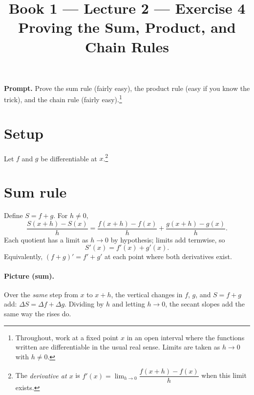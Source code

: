 \documentclass[11pt]{article}
\title{\textbf{Book 1 --- Lecture 2 --- Exercise 4}\\[2mm]
\large Proving the Sum, Product, and Chain Rules}
\author{}
\date{}
\newcommand{\promptbox}[1]{%
  \begin{savenotes}%
  \begingroup\setlength{\fboxsep}{10pt}\noindent
  \colorbox{blue!8}{\parbox{\dimexpr\linewidth-2\fboxsep\relax}{\textbf{Prompt. }#1}}
  \endgroup
  \end{savenotes}%
}
\begin{document}
\maketitle

\promptbox{Prove the sum rule (fairly easy), the product rule (easy if you know
the trick), and the chain rule (fairly easy).\footnote{Throughout, work at a fixed
point \(x\) in an open interval where the functions written are differentiable in
the usual real sense. Limits are taken as \(h\to 0\) with \(h\neq 0\).}}

\section*{Setup}
Let \(f\) and \(g\) be differentiable at \(x\).\footnote{The \emph{derivative at
\(x\)} is \(f'(x)=\lim_{h\to 0}\dfrac{f(x+h)-f(x)}{h}\) when this limit exists.}

\section*{Sum rule}
Define \(S=f+g\). For \(h\neq 0\),
\[
\frac{S(x+h)-S(x)}{h}
=\frac{f(x+h)-f(x)}{h}+\frac{g(x+h)-g(x)}{h}.
\]
Each quotient has a limit as \(h\to 0\) by hypothesis; limits add termwise, so
\[
S'(x)=f'(x)+g'(x).
\]
Equivalently, \((f+g)'=f'+g'\) at each point where both derivatives exist.

\paragraph{Picture (sum).}
Over the \emph{same} step from \(x\) to \(x+h\), the vertical changes in \(f\),
\(g\), and \(S=f+g\) add: \(\Delta S=\Delta f+\Delta g\). Dividing by \(h\) and
letting \(h\to 0\), the secant slopes add the same way the rises do.
\end{document}
